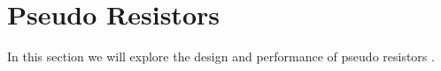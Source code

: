 \documentclass[../main.tex]{subfiles}
\begin{document}
\section{Pseudo Resistors}

In this section we will explore the design and performance of pseudo resistors \cite{hossein}.
\end{document}
